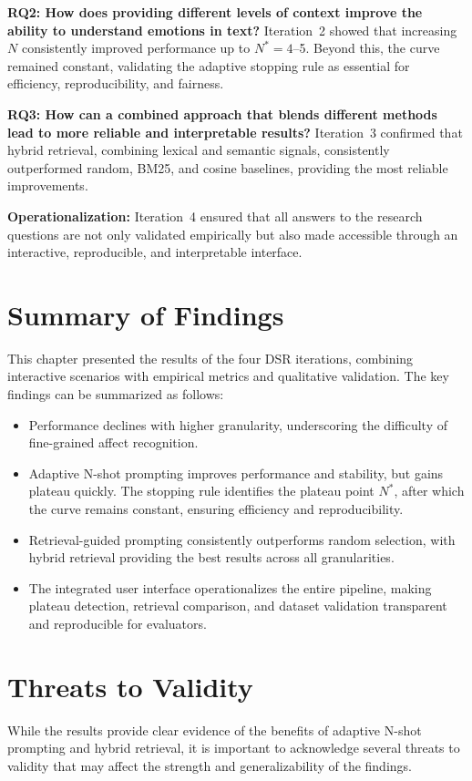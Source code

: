 \textbf{RQ2: How does providing different levels of context improve the ability to understand emotions in text?}  
Iteration~2 showed that increasing $N$ consistently improved performance up to $N^{\ast}=4$–5. Beyond this, the curve remained constant, validating the adaptive stopping rule as essential for efficiency, reproducibility, and fairness.  

\textbf{RQ3: How can a combined approach that blends different methods lead to more reliable and interpretable results?}  
Iteration~3 confirmed that hybrid retrieval, combining lexical and semantic signals, consistently outperformed random, BM25, and cosine baselines, providing the most reliable improvements.  

\textbf{Operationalization:} Iteration~4 ensured that all answers to the research questions are not only validated empirically but also made accessible through an interactive, reproducible, and interpretable interface.  

\section{Summary of Findings}
This chapter presented the results of the four DSR iterations, combining interactive scenarios with empirical metrics and qualitative validation. The key findings can be summarized as follows:
\begin{itemize}
    \item Performance declines with higher granularity, underscoring the difficulty of fine-grained affect recognition.  
    \item Adaptive N-shot prompting improves performance and stability, but gains plateau quickly. The stopping rule identifies the plateau point $N^{\ast}$, after which the curve remains constant, ensuring efficiency and reproducibility.  
    \item Retrieval-guided prompting consistently outperforms random selection, with hybrid retrieval providing the best results across all granularities.  
    \item The integrated user interface operationalizes the entire pipeline, making plateau detection, retrieval comparison, and dataset validation transparent and reproducible for evaluators.  
\end{itemize}

\section{Threats to Validity}
While the results provide clear evidence of the benefits of adaptive N-shot prompting and hybrid retrieval, it is important to acknowledge several threats to validity that may affect the strength and generalizability of the findings.

